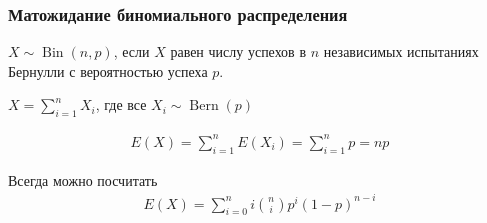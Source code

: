\documentclass[hyperref=unicode,graphics=pdflatex,13pt,xcolor={usenames,dvipsnames}]{beamer}
\renewcommand\emph[1]{{\color{blue}{#1}}}
\DeclareMathOperator{\Bin}{Bin}
\DeclareMathOperator{\Bern}{Bern}
\begin{document}
\begin{frame}
  \frametitle{Матожидание биномиального распределения}
  \emph{Напоминание:} $X \sim \Bin(n, p)$, если $X$ равен числу успехов в $n$ независимых испытаниях Бернулли с вероятностью успеха $p$.

  \pause \vspace{1cm}

  $X = \sum_{i = 1}^n X_i$, где все $X_i \sim \Bern(p)$

  \pause

  \begin{align*}
    E(X) = \sum_{i = 1}^n E(X_i) = \sum_{i = 1}^n p = np
  \end{align*}

  \pause

  Всегда можно посчитать \emph{в лоб}
  \begin{align*}
    E(X) = \sum_{i = 0}^n i \binom{n}{i}p^i(1 - p)^{n - i}
  \end{align*}
\end{frame}
\end{document}
